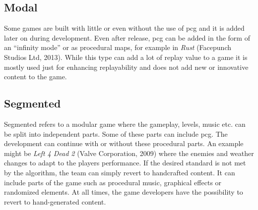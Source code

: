 \documentclass[10pt,a4paper]{article}
\begin{document}
\subsection{Modal}
\begin{multicols}{2} Some games are built with little or even without the use of \gls{pcg} and it is added later on during development. Even after release, \gls{pcg} can be added in the form of an “infinity mode” or as procedural maps, for example in \textit{Rust} (Facepunch Studios Ltd, 2013). While this type can add a lot of replay value to a game it is mostly used just for enhancing replayability and does not add new or innovative content to the game.
\end{multicols}
\subsection{Segmented}
\begin{multicols}{2} Segmented refers to a modular game where the gameplay, levels, music etc. can be split into independent parts. Some of these parts can include \gls{pcg}. The development can continue with or without these procedural parts. An example might be \textit{Left 4 Dead 2} (Valve Corporation, 2009) where the enemies and weather changes to adapt to the players performance. If the desired standard is not met by the algorithm, the team can simply revert to handcrafted content. It can include parts of the game such as procedural music, graphical effects or randomized elements. At all times, the game developers have the possibility to revert to hand-generated content.
\end{multicols}
\end{document}

